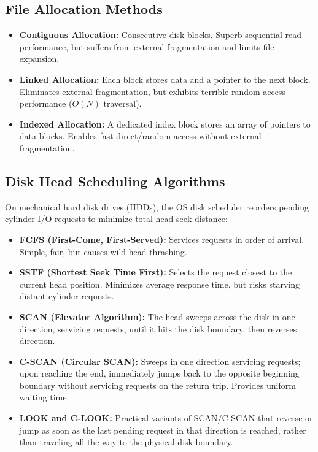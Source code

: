 \subsection{File Allocation Methods}
\begin{itemize}
    \item \textbf{Contiguous Allocation:} Consecutive disk blocks. Superb sequential read performance, but suffers from external fragmentation and limits file expansion.
    \item \textbf{Linked Allocation:} Each block stores data and a pointer to the next block. Eliminates external fragmentation, but exhibits terrible random access performance ($O(N)$ traversal).
    \item \textbf{Indexed Allocation:} A dedicated index block stores an array of pointers to data blocks. Enables fast direct/random access without external fragmentation.
\end{itemize}

\subsection{Disk Head Scheduling Algorithms}
On mechanical hard disk drives (HDDs), the OS disk scheduler reorders pending cylinder I/O requests to minimize total head seek distance:
\begin{itemize}
    \item \textbf{FCFS (First-Come, First-Served):} Services requests in order of arrival. Simple, fair, but causes wild head thrashing.
    \item \textbf{SSTF (Shortest Seek Time First):} Selects the request closest to the current head position. Minimizes average response time, but risks starving distant cylinder requests.
    \item \textbf{SCAN (Elevator Algorithm):} The head sweeps across the disk in one direction, servicing requests, until it hits the disk boundary, then reverses direction.
    \item \textbf{C-SCAN (Circular SCAN):} Sweeps in one direction servicing requests; upon reaching the end, immediately jumps back to the opposite beginning boundary without servicing requests on the return trip. Provides uniform waiting time.
    \item \textbf{LOOK and C-LOOK:} Practical variants of SCAN/C-SCAN that reverse or jump as soon as the last pending request in that direction is reached, rather than traveling all the way to the physical disk boundary.
\end{itemize}

